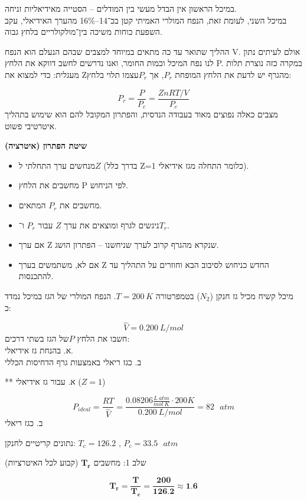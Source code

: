 \documentclass[
  hebrew,
  letterpaper,
  DIV=11,
  numbers=noendperiod]{scrreprt}
\begin{document}
במיכל הראשון אין הבדל מעשי בין המודלים -- הסטייה מאידיאליות זניחה.\\
במיכל השני, לעומת זאת, הנפח המולרי האמיתי קטן בכ־14--16\% מהערך
האידיאלי, עקב השפעת כוחות משיכה בין־מולקולריים בלחץ גבוה.

ההליך שתואר עד כה מתאים במיוחד למצבים שבהם הנעלם הוא הנפח V. אולם לעיתים
נתון לנו נפח המיכל וכמות החומר, ואנו נדרשים לחשב דווקא את הלחץ P. במקרה
כזה נוצרת תלות מעגלית: כדי למצוא את Zמהגרף יש לדעת את הלחץ המופחת
\(P_{r}\), אך \(P_{r}\)עצמו תלוי בלחץ:

\[P_{r} = \frac{P}{P_{c}} = \frac{ZnRT/V}{P_{c}}\] מצבים כאלה נפוצים
מאוד בעבודה הנדסית, והפתרון המקובל להם הוא שימוש בתהליך איטרטיבי פשוט.

\textbf{שיטת הפתרון (איטרציה)}

\begin{itemize}
\item
  מנחשים ערך התחלתי ל\(Z\) (בדרך כלל Z=1 כלומר התחלה מגז אידיאלי).
\item
  מחשבים את הלחץ P לפי הניחוש.
\item
  מחשבים את \(P_{r}\) המתאים.
\item
  ניגשים לגרף ומוצאים את ערך \(Z\) עבור \(P_{r}\) ו־\(T_{r}\).
\item
  אם ערך Z שנקרא מהגרף קרוב לערך שניחשנו -- הפתרון הושג.
\item
  אם לא, משתמשים בערך Z החדש כניחוש לסיבוב הבא וחוזרים על התהליך עד
  להתכנסות.
\end{itemize}

מיכל קשיח מכיל גז חנקן (\(N_{2}\)) בטמפרטורה \(T = 200\text{ }K\). הנפח
המולרי של הגז במיכל נמדד כ:

\[\widehat{V} = 0.200\ L/mol\] חשבו את הלחץ \(P\)של הגז בשתי דרכים:\\
א. בהנחת גז אידיאלי.\\
ב. כגז ריאלי באמצעות גרף הדחיסות הכללי

** א. עבור גז אידיאלי (\(Z = 1\))

\[P_{ideal} = \frac{RT}{\widehat{V}} = \frac{0.08206\frac{L\ atm}{mol\ K} \cdot 200K}{0.200\ L/mol} = 82\text{ }atm\]
ב. כגז ריאלי

נתונים קריטיים לחנקן: \(T_{c} = 126.2\text{ , }P_{c} = 33.5\text{ }atm\)

שלב 1: מחשבים \(\mathbf{T}_{\mathbf{r}}\) (קבוע לכל האיטרציות)

\[\mathbf{T}_{\mathbf{r}} = \frac{\mathbf{T}}{\mathbf{T}_{\mathbf{c}}} = \frac{\mathbf{200}}{\mathbf{126}.\mathbf{2}} \approx \mathbf{1}.\mathbf{6}\]
\end{document}
